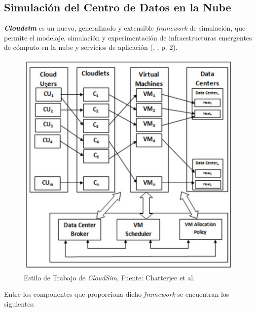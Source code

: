 \subsection{Simulaci\'on del Centro de Datos en la Nube}

 \textit{\textbf{Cloudsim}} es un nuevo, generalizado y extensible \textit{framework} de simulaci\'on, que permite el modelaje, simulaci\'on y experimentaci\'on de infraestructuras emergentes de c\'omputo en la nube y servicios de aplicaci\'on (\citeauthor{calheiros2011cloudsim}, \citeyear{calheiros2011cloudsim}, p. 2).


\setcounter{figure}{2}
\renewcommand\thefigure{\arabic{figure}}
\begin{figure}[h!]
	\centering
	\includegraphics[scale=0.5]{media/imagenuno}
	\caption{Estilo de Trabajo de \textit{CloudSim}, Fuente: Chatterjee et al.}
	\label{fig:TrabajoCloudsim}
	
\end{figure}


Entre los componentes que proporciona dicho \textit{framework} se encuentran los siguientes:

